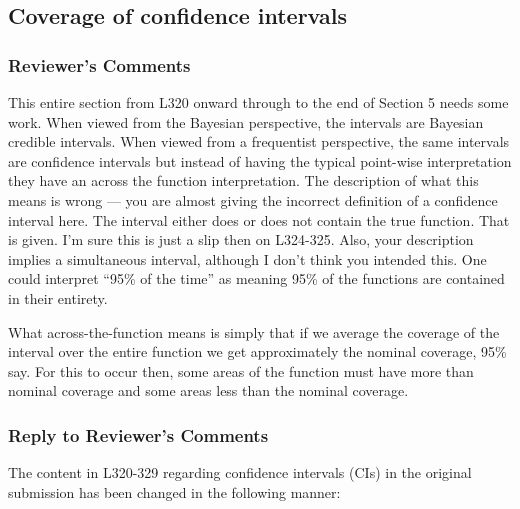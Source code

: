 \documentclass[
]{article}
\begin{document}
\hypertarget{coverage-of-confidence-intervals}{%
\subsection{Coverage of confidence intervals}\label{coverage-of-confidence-intervals}}

\hypertarget{reviewers-comments-7}{%
\subsubsection{Reviewer's Comments}\label{reviewers-comments-7}}

This entire section from L320 onward through to the end of Section 5 needs some work. When viewed from the Bayesian perspective, the intervals are Bayesian credible intervals. When viewed from a frequentist perspective, the same intervals are confidence intervals but instead of having the typical point-wise interpretation they have an across the function interpretation.
The description of what this means is wrong --- you are almost giving the incorrect definition of a confidence interval here. The interval either does or does not contain the true function. That is given. I'm sure this is just a slip then on L324-325.
Also, your description implies a simultaneous interval, although I don't think you intended this. One could interpret ``95\% of the time'' as meaning 95\% of the functions are contained in their entirety.

What across-the-function means is simply that if we average the coverage of the interval over the entire function we get approximately the nominal coverage, 95\% say. For this to occur then, some areas of the function must have more
than nominal coverage and some areas less than the nominal coverage.

\hypertarget{section-8}{%
\subsubsection{\texorpdfstring{\textcolor{reviewersblue} {Reply to Reviewer's Comments}}{}}\label{section-8}}

The content in L320-329 regarding confidence intervals (CIs) in the original submission has been changed in the following manner:
\end{document}
